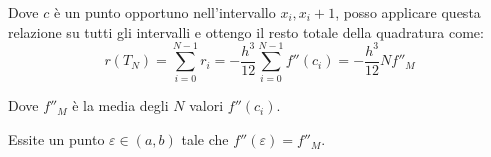 Dove $c$ è un punto opportuno nell'intervallo $x_i, x_i +1$, posso applicare questa relazione su tutti gli intervalli
e ottengo il resto totale della quadratura come:
\begin{equation}
  r(T_N) = \sum_{i = 0}^{N-1} r_i = -\frac{h^3}{12}\sum_{i = 0}^{N-1}  f''(c_i) = -\frac{h^3}{12} N f''_M
\end{equation}

Dove $f''_M$ è la media degli $N$ valori $f''(c_i)$.

Essite un punto $\varepsilon \in (a, b)$ tale che $f''(\varepsilon) = f''_M$.



